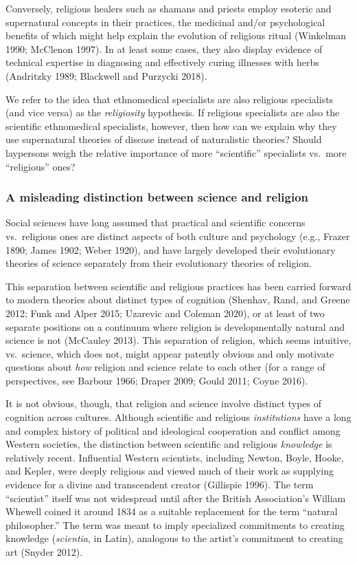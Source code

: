 \documentclass[
  11pt,
]{article}
\begin{document}
Conversely, religious healers such as shamans and priests employ esoteric and supernatural concepts in their practices, the medicinal and/or psychological benefits of which might help explain the evolution of religious ritual (Winkelman 1990; McClenon 1997). In at least some cases, they also display evidence of technical expertise in diagnosing and effectively curing illnesses with herbs (Andritzky 1989; Blackwell and Purzycki 2018).

We refer to the idea that ethnomedical specialists are also religious specialists (and vice versa) as the \emph{religiosity} hypothesis. If religious specialists are also the scientific ethnomedical specialists, however, then how can we explain why they use supernatural theories of disease instead of naturalistic theories? Should laypersons weigh the relative importance of more ``scientific'' specialists vs.~more ``religious'' ones?

\hypertarget{a-misleading-distinction-between-science-and-religion}{%
\subsubsection{A misleading distinction between science and religion}\label{a-misleading-distinction-between-science-and-religion}}

Social sciences have long assumed that practical and scientific concerns vs.~religious ones are distinct aspects of both culture and psychology (e.g., Frazer 1890; James 1902; Weber 1920), and have largely developed their evolutionary theories of science separately from their evolutionary theories of religion.

This separation between scientific and religious practices has been carried forward to modern theories about distinct types of cognition (Shenhav, Rand, and Greene 2012; Funk and Alper 2015; Uzarevic and Coleman 2020), or at least of two separate positions on a continuum where religion is developmentally natural and science is not (McCauley 2013). This separation of religion, which seems intuitive, vs.~science, which does not, might appear patently obvious and only motivate questions about \emph{how} religion and science relate to each other (for a range of perspectives, see Barbour 1966; Draper 2009; Gould 2011; Coyne 2016).

It is not obvious, though, that religion and science involve distinct types of cognition across cultures. Although scientific and religious \emph{institutions} have a long and complex history of political and ideological cooperation and conflict among Western societies, the distinction between scientific and religious \emph{knowledge} is relatively recent. Influential Western scientists, including Newton, Boyle, Hooke, and Kepler, were deeply religious and viewed much of their work as supplying evidence for a divine and transcendent creator (Gillispie 1996). The term ``scientist'' itself was not widespread until after the British Association's William Whewell coined it around 1834 as a suitable replacement for the term ``natural philosopher.'' The term was meant to imply specialized commitments to creating knowledge (\emph{scientia}, in Latin), analogous to the artist's commitment to creating art (Snyder 2012).
\end{document}
